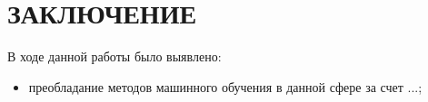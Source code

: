 \chapter*{ЗАКЛЮЧЕНИЕ}

В ходе данной работы было выявлено:
\begin{itemize}
    \item преобладание методов машинного обучения в данной сфере за счет
        ...;
\end{itemize}
